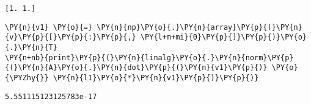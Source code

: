     \begin{Verbatim}[commandchars=\\\{\}]
[1. 1.]
    \end{Verbatim}

    \begin{tcolorbox}[breakable, size=fbox, boxrule=1pt, pad at break*=1mm,colback=cellbackground, colframe=cellborder]
\begin{Verbatim}[commandchars=\\\{\}]
\PY{n}{v1} \PY{o}{=} \PY{n}{np}\PY{o}{.}\PY{n}{array}\PY{p}{(}\PY{n}{v}\PY{p}{[}\PY{p}{:}\PY{p}{,} \PY{l+m+mi}{0}\PY{p}{]}\PY{p}{)}\PY{o}{.}\PY{n}{T}
\PY{n+nb}{print}\PY{p}{(}\PY{n}{linalg}\PY{o}{.}\PY{n}{norm}\PY{p}{(}\PY{n}{A}\PY{o}{.}\PY{n}{dot}\PY{p}{(}\PY{n}{v1}\PY{p}{)} \PY{o}{\PYZhy{}} \PY{n}{l1}\PY{o}{*}\PY{n}{v1}\PY{p}{)}\PY{p}{)}
\end{Verbatim}
\end{tcolorbox}

    \begin{Verbatim}[commandchars=\\\{\}]
5.551115123125783e-17
    \end{Verbatim}
